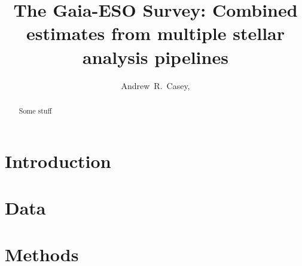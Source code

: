 \documentclass[preprint]{aastex}
\begin{document}
\title{The Gaia-ESO Survey: Combined estimates from multiple stellar analysis pipelines}

\author{
    Andrew~R.~Casey,
   }


\begin{abstract}
Some stuff
\end{abstract}




\section{Introduction} 
\label{sec:introduction}










\section{Data}
\label{sec:data}





\section{Methods}
\label{sec:methods}




\end{document}
